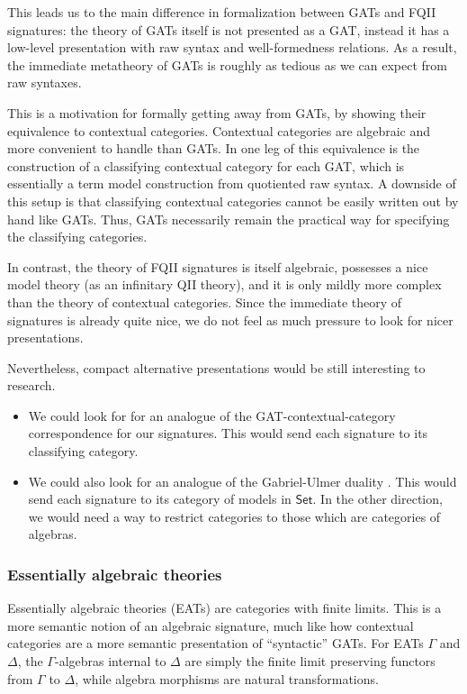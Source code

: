 \documentclass[12pt,a4paper,twoside,openany]{book}
\theoremstyle{remark}
\theoremstyle{definition}
\theoremstyle{theorem}
\newcommand{\bs}[1]{\boldsymbol{#1}}
\newcommand{\Set}{\mathsf{Set}}
\begin{document}
This leads us to the main difference in formalization between GATs and FQII
signatures: the theory of GATs itself is not presented as a GAT, instead it has
a low-level presentation with raw syntax and well-formedness relations. As a
result, the immediate metatheory of GATs is roughly as tedious as we can expect
from raw syntaxes.

This is a motivation for formally getting away from GATs, by showing their
equivalence to contextual categories. Contextual categories are algebraic and
more convenient to handle than GATs. In \cite{cartmellthesis} one leg of this
equivalence is the construction of a classifying contextual category for each
GAT, which is essentially a term model construction from quotiented raw
syntax. A downside of this setup is that classifying contextual categories
cannot be easily written out by hand like GATs. Thus, GATs necessarily remain
the practical way for specifying the classifying categories.

In contrast, the theory of FQII signatures is itself algebraic, possesses a nice
model theory (as an infinitary QII theory), and it is only mildly more complex
than the theory of contextual categories. Since the immediate theory of
signatures is already quite nice, we do not feel as much pressure to look for
nicer presentations.

Nevertheless, compact alternative presentations would be still interesting to
research.
\begin{itemize}
  \item We could look for for an analogue of the
    GAT-contextual-category correspondence for our signatures. This would
    send each signature to its classifying category.
  \item We could also look for an analogue of the Gabriel-Ulmer duality
    \cite{gabriel2006lokal}. This would send each signature to its category of models in
    $\bs{\Set}$. In the other direction, we would need a way to restrict categories
    to those which are categories of algebras.
\end{itemize}

\subsubsection{Essentially algebraic theories}

Essentially algebraic theories (EATs) \cite{freyd1972aspects} are categories
with finite limits. This is a more semantic notion of an algebraic signature,
much like how contextual categories are a more semantic presentation of
``syntactic'' GATs. For EATs $\Gamma$ and $\Delta$, the $\Gamma$-algebras
internal to $\Delta$ are simply the finite limit preserving functors from
$\Gamma$ to $\Delta$, while algebra morphisms are natural transformations.
\end{document}
